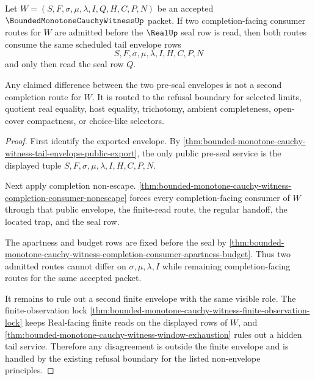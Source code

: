\begin{theorem}
\label{thm:bounded-monotone-cauchy-witness-envelope-uniqueness}
Let $W=(S,F,\sigma,\mu,\lambda,I,Q,H,C,P,N)$ be an accepted $\BoundedMonotoneCauchyWitnessUp$ packet. If two completion-facing consumer routes for $W$ are admitted before the $\RealUp$ seal row is read, then both routes consume the same scheduled tail envelope rows
$$
S,F,\sigma,\mu,\lambda,I,H,C,P,N
$$
and only then read the seal row $Q$.

Any claimed difference between the two pre-seal envelopes is not a second completion route for $W$. It is routed to the refusal boundary for selected limits, quotient real equality, host equality, trichotomy, ambient completeness, open-cover compactness, or choice-like selectors.
\end{theorem}
\begin{proof}
First identify the exported envelope. By \autoref{thm:bounded-monotone-cauchy-witness-tail-envelope-public-export}, the only public pre-seal service is the displayed tuple $S,F,\sigma,\mu,\lambda,I,H,C,P,N$.

Next apply completion non-escape. \autoref{thm:bounded-monotone-cauchy-witness-completion-consumer-nonescape} forces every completion-facing consumer of $W$ through that public envelope, the finite-read route, the regular handoff, the located trap, and the seal row.

The apartness and budget rows are fixed before the seal by \autoref{thm:bounded-monotone-cauchy-witness-completion-consumer-apartness-budget}. Thus two admitted routes cannot differ on $\sigma,\mu,\lambda,I$ while remaining completion-facing routes for the same accepted packet.

It remains to rule out a second finite envelope with the same visible role. The finite-observation lock \autoref{thm:bounded-monotone-cauchy-witness-finite-observation-lock} keeps Real-facing finite reads on the displayed rows of $W$, and \autoref{thm:bounded-monotone-cauchy-witness-window-exhaustion} rules out a hidden tail service. Therefore any disagreement is outside the finite envelope and is handled by the existing refusal boundary for the listed non-envelope principles.
\end{proof}

